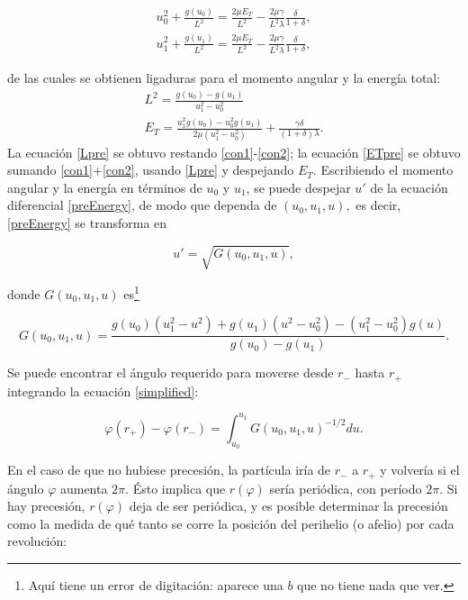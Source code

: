 \documentclass{article}
\begin{document}
\begin{gather}
	u_{0}^{2}+\frac{g\left(u_{0}\right)}{L^{2}}=\frac{2 \mu E_{T}}{L^{2}}-\frac{2 \mu \gamma}{L^{2} \lambda} \frac{\delta}{1+\delta},\label{con1}\\
	u_{1}^{2}+\frac{g\left(u_{1}\right)}{L^{2}}=\frac{2 \mu E_{T}}{L^{2}}-\frac{2 \mu \gamma}{L^{2} \lambda} \frac{\delta}{1+\delta}\label{con2},
\end{gather}

de las cuales se obtienen ligaduras para el momento angular y la energía total:
\begin{gather}
	L^{2}=\frac{g\left(u_{0}\right)-g\left(u_{1}\right)}{u_{1}^{2}-u_{0}^{2}}\label{Lpre}\\
	E_{T}=\frac{u_{1}^{2} g\left(u_{0}\right)-u_{0}^{2} g\left(u_{1}\right)}{2 \mu\left(u_{1}^{2}-u_{0}^{2}\right)}+\frac{ \gamma \delta}{(1+\delta) \lambda}\label{ETpre}.
\end{gather}
La ecuación \eqref{Lpre} se obtuvo restando \eqref{con1}-\eqref{con2}; la ecuación \eqref{ETpre} se obtuvo sumando \eqref{con1}+\eqref{con2}, usando \eqref{Lpre} y despejando $E_T$. Escribiendo el momento angular y la energía en términos de $u_0$ y $u_1$, se puede despejar $u'$ de la ecuación diferencial \eqref{preEnergy}, de modo que dependa de $(u_0,u_1,u),$ es decir, \eqref{preEnergy} se transforma en

\begin{equation}\label{simplified}
	u'=\sqrt{G(u_0,u_1,u)},
\end{equation}

donde $G(u_0,u_1,u)$ es\footnote{Aquí \cite{Capozziello} tiene un error de digitación: aparece una $b$ que no tiene nada que ver.}

\begin{equation}
	G\left(u_{0}, u_{1}, u\right)=\frac{g\left(u_{0}\right)\left(u_{1}^{2}-u^{2}\right)+g\left(u_{1}\right)\left(u^{2}-u_{0}^{2}\right)-\left(u_1^{2}-u_{0}^{2}\right) g(u)}{g\left(u_{0}\right)-g\left(u_{1}\right)}.
\end{equation}

Se puede encontrar el ángulo requerido para moverse desde $r_-$ hasta $r_+$ integrando la ecuación \eqref{simplified}:

\begin{equation}\label{integralPrecession}
	\varphi(r_+)-\varphi(r_-)=\int_{u_0}^{u_1} G(u_0,u_1,u)^{-1/2}du.
\end{equation}

En el caso de que no hubiese precesión, la partícula iría de $r_-$ a $r_+$ y volvería si el ángulo $\varphi$ aumenta $2\pi$. Ésto implica que $r(\varphi)$ sería periódica, con período $2\pi$. Si hay precesión, $r(\varphi)$ deja de ser periódica, y es posible determinar la precesión como la medida de qué tanto se corre la posición del perihelio (o afelio) por cada revolución:
\end{document}

